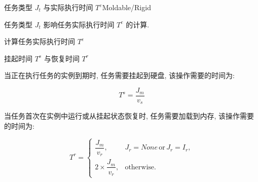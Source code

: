 \begin{frame}[fragile]{任务类型 $J_t$ 与实际执行时间 $T^e$}{Moldable/Rigid}

    任务类型 $J_t$ 影响任务实际执行时间 $T^e$ 的计算.

    \centering
    \begin{minipage}{0.7\textwidth}
        \IncMargin{1.5em}
        \begin{algorithm}[H]
            \SetAlgoLined
            \caption{计算任务实际执行时间 $T^e$}
        \end{algorithm}
        \DecMargin{1.5em}
    \end{minipage}

\end{frame}

\begin{frame}{挂起时间 $T^s$ 与恢复时间 $T^r$}

    当正在执行任务的实例到期时, 任务需要挂起到硬盘, 该操作需要的时间为:

    \begin{equation*}
        T^s = \frac{J_m}{v_s}
    \end{equation*}

    当任务首次在实例中运行或从挂起状态恢复时, 任务需要加载到内存, 该操作需要的时间为:

    \begin{equation*}
        T^r = \begin{cases}
            \dfrac{J_m}{v_r},          & J_r = None \, \text{or} \, J_r = I_r, \\
            2 \times \dfrac{J_m}{v_r}, & \text{otherwise}.
        \end{cases}
    \end{equation*}

\end{frame}
